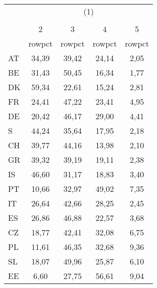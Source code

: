 {
\def\sym#1{\ifmmode^{#1}\else\(^{#1}\)\fi}
\begin{tabular}{l*{4}{c}}
\hline\hline
            &\multicolumn{4}{c}{(1)}                            \\
            &\multicolumn{4}{c}{}                               \\
            &           2&           3&           4&           5\\
            &      rowpct&      rowpct&      rowpct&      rowpct\\
\hline
AT          &       34,39&       39,42&       24,14&        2,05\\
BE          &       31,43&       50,45&       16,34&        1,77\\
DK          &       59,34&       22,61&       15,24&        2,81\\
FR          &       24,41&       47,22&       23,41&        4,95\\
DE          &       20,42&       46,17&       29,00&        4,41\\
S           &       44,24&       35,64&       17,95&        2,18\\
CH          &       39,77&       44,16&       13,98&        2,10\\
GR          &       39,32&       39,19&       19,11&        2,38\\
IS          &       46,60&       31,17&       18,83&        3,40\\
PT          &       10,66&       32,97&       49,02&        7,35\\
IT          &       26,64&       42,66&       28,25&        2,45\\
ES          &       26,86&       46,88&       22,57&        3,68\\
CZ          &       18,77&       42,41&       32,08&        6,75\\
PL          &       11,61&       46,35&       32,68&        9,36\\
SL          &       18,07&       49,96&       25,87&        6,10\\
EE          &        6,60&       27,75&       56,61&        9,04\\
\hline\hline
\end{tabular}
}
